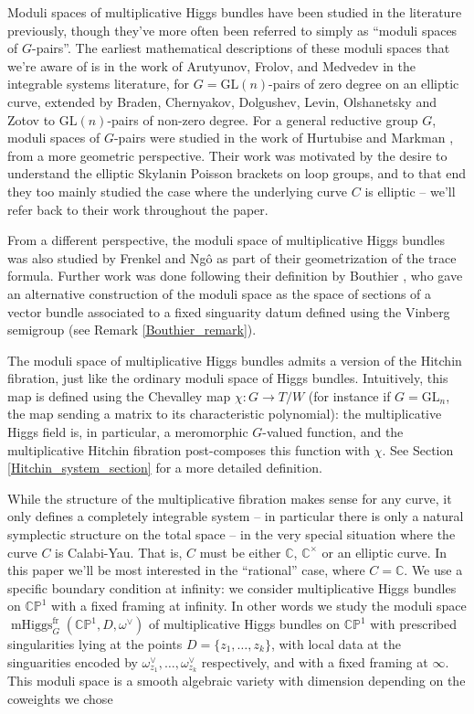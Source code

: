 \documentclass[11pt, oneside, reqno]{amsart}
\theoremstyle{definition} \newtheorem{definition}{Definition}[section]
\theoremstyle{definition} \newtheorem{remark}[definition]{Remark}
\theoremstyle{definition} \newtheorem{remarks}[definition]{Remarks}
\theoremstyle{definition} \newtheorem{question}[definition]{Question}
\theoremstyle{definition} \newtheorem*{note}{Note}
\theoremstyle{definition} \newtheorem{example}[definition]{Example}
\theoremstyle{definition} \newtheorem{examples}[definition]{Examples}
\newcommand{\bb}[1]{\mathbb{#1}}
\newcommand{\CC}{\mathbb{C}}
\newcommand{\GL}{\mathrm{GL}}
\DeclareMathOperator{\mhiggs}{mHiggs}
\begin{document}
 Moduli spaces of multiplicative Higgs bundles have been studied in
 the literature previously, though they've more often been referred to
 simply as ``moduli spaces of $G$-pairs''.  The earliest mathematical  descriptions of these moduli spaces that we're aware of is in the work of Arutyunov, Frolov, and Medvedev \cite{Arutyunov:1996vy,Arutyunov:1996uw} in the integrable systems literature, for $G = \GL(n)$-pairs of zero degree on an elliptic curve, extended by Braden, Chernyakov, Dolgushev, Levin, Olshanetsky
 and Zotov \cite{Chernyakov:2007,Braden:2003gf} to $\GL(n)$-pairs of non-zero degree.  For a general reductive group $G$, moduli spaces of $G$-pairs were studied in the work of Hurtubise and Markman \cite{HurtubiseMarkman, HurtubiseMarkman1}, from a more geometric perspective.  Their work was motivated by the desire to understand the elliptic Skylanin Poisson brackets on
 loop groups, and to that end they too mainly studied the case where the
 underlying curve $C$ is elliptic -- we'll refer back to their work
 throughout the paper.  

 From a different perspective, the moduli space of multiplicative Higgs bundles was also studied by Frenkel and Ng\^o \cite[Section 4]{FrenkelNgo} as part of their geometrization of the trace formula.  Further work was done following their definition by Bouthier \cite{Bouthier2, Bouthier1}, who gave an alternative construction of the moduli space as the space of sections of a vector bundle associated to a fixed singuarity datum defined using the Vinberg semigroup (see Remark \ref{Bouthier_remark}).  
 
 The moduli space of multiplicative Higgs bundles admits a version of the Hitchin fibration, just like the ordinary moduli space of Higgs bundles.  Intuitively, this map is defined using the Chevalley map $\chi \colon G \to T/W$ (for instance if $G = \GL_n$, the map sending a matrix to its characteristic polynomial): the multiplicative Higgs field is, in particular, a meromorphic $G$-valued function, and the multiplicative Hitchin fibration post-composes this function with $\chi$.  See Section \ref{Hitchin_system_section} for a more detailed definition.
 
 While the structure of the multiplicative fibration makes sense for any curve, it only defines a completely integrable system -- in particular there is only a natural symplectic structure on the total space -- in the very special situation where the curve $C$ is Calabi-Yau.  That is, $C$ must be either $\CC$, $\CC^\times$ or an elliptic curve.  In this paper we'll be most interested in the ``rational'' case, where $C = \CC$.  We use a specific boundary condition at infinity: we consider multiplicative Higgs bundles on $\bb{CP}^1$ with a fixed framing at infinity.  In other words we study the moduli space $\mhiggs^{\text{fr}}_G(\bb{CP}^1,D,\omega^\vee)$ of multiplicative Higgs bundles on $\bb{CP}^1$ with prescribed singularities lying at the points $D = \{z_1, \ldots, z_k\}$, with local data at the singuarities encoded by $\omega_{z_1}^\vee, \ldots, \omega_{z_k}^\vee$ respectively, and with a fixed framing at $\infty$.  This moduli space is a smooth algebraic variety with dimension depending on the coweights we chose
 
\end{document}
